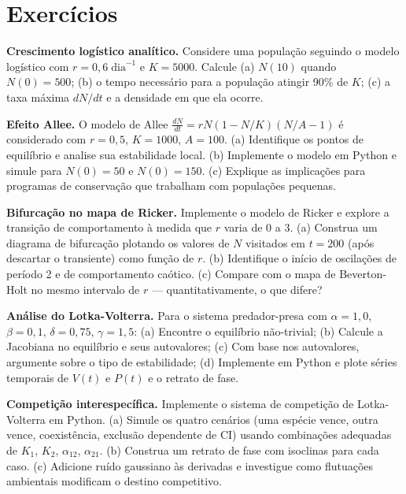 \section{Exercícios}
\label{sec:10-exercicios}

\begin{exercicio}
\textbf{Crescimento logístico analítico.} Considere uma população seguindo o
modelo logístico com $r = 0{,}6\;\mathrm{dia}^{-1}$ e $K = 5000$.
Calcule (a) $N(10)$ quando $N(0) = 500$; (b) o tempo necessário para a
população atingir 90\% de $K$; (c) a taxa máxima $dN/dt$ e a densidade em que
ela ocorre.
\end{exercicio}

\begin{exercicio}
\textbf{Efeito Allee.} O modelo de Allee
$\tfrac{dN}{dt} = rN(1 - N/K)(N/A - 1)$
é considerado com $r = 0{,}5$, $K = 1000$, $A = 100$.
(a) Identifique os pontos de equilíbrio e analise sua estabilidade local.
(b) Implemente o modelo em Python e simule para $N(0) = 50$ e $N(0) = 150$.
(c) Explique as implicações para programas de conservação que trabalham
com populações pequenas.
\end{exercicio}

\begin{exercicio}
\textbf{Bifurcação no mapa de Ricker.} Implemente o modelo de Ricker e
explore a transição de comportamento à medida que $r$ varia de 0 a 3.
(a) Construa um diagrama de bifurcação plotando os valores de $N$ visitados
em $t = 200$ (após descartar o transiente) como função de $r$.
(b) Identifique o início de oscilações de período 2 e de comportamento
caótico.
(c) Compare com o mapa de Beverton-Holt no mesmo intervalo de $r$ ---
quantitativamente, o que difere?
\end{exercicio}

\begin{exercicio}
\textbf{Análise do Lotka-Volterra.} Para o sistema predador-presa com
$\alpha = 1{,}0$, $\beta = 0{,}1$, $\delta = 0{,}75$, $\gamma = 1{,}5$:
(a) Encontre o equilíbrio não-trivial;
(b) Calcule a Jacobiana no equilíbrio e seus autovalores;
(c) Com base nos autovalores, argumente sobre o tipo de estabilidade;
(d) Implemente em Python e plote séries temporais de $V(t)$ e $P(t)$ e o
retrato de fase.
\end{exercicio}

\begin{exercicio}
\textbf{Competição interespecífica.} Implemente o sistema de competição de
Lotka-Volterra em Python. (a) Simule os quatro cenários
(uma espécie vence, outra vence, coexistência, exclusão dependente de CI)
usando combinações adequadas de $K_1$, $K_2$, $\alpha_{12}$, $\alpha_{21}$.
(b) Construa um retrato de fase com isoclinas para cada caso.
(c) Adicione ruído gaussiano às derivadas e investigue como flutuações
ambientais modificam o destino competitivo.
\end{exercicio}

